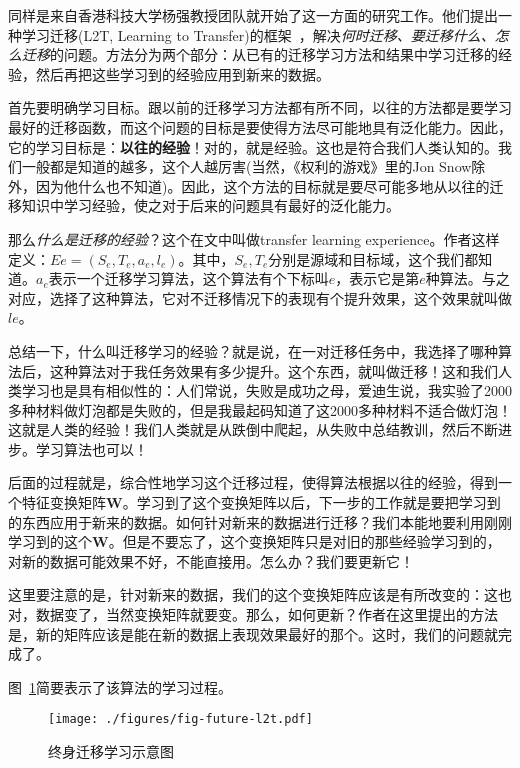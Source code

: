 同样是来自香港科技大学杨强教授团队就开始了这一方面的研究工作。他们提出一种学习迁移(L2T, Learning to Transfer)的框架~\cite{wei2017learning}，解决\textit{何时迁移、要迁移什么、怎么迁移}的问题。方法分为两个部分：从已有的迁移学习方法和结果中学习迁移的经验，然后再把这些学习到的经验应用到新来的数据。

首先要明确学习目标。跟以前的迁移学习方法都有所不同，以往的方法都是要学习最好的迁移函数，而这个问题的目标是要使得方法尽可能地具有泛化能力。因此，它的学习目标是：\textbf{以往的经验}！对的，就是经验。这也是符合我们人类认知的。我们一般都是知道的越多，这个人越厉害(当然，《权利的游戏》里的Jon Snow除外，因为他什么也不知道)。因此，这个方法的目标就是要尽可能多地从以往的迁移知识中学习经验，使之对于后来的问题具有最好的泛化能力。 

那么\textit{什么是迁移的经验}？这个在文中叫做transfer learning experience。作者这样定义：$Ee=(S_e,T_e,a_e,l_e)$。其中，$S_e,T_e$分别是源域和目标域，这个我们都知道。$a_e$表示一个迁移学习算法，这个算法有个下标叫$e$，表示它是第$e$种算法。与之对应，选择了这种算法，它对不迁移情况下的表现有个提升效果，这个效果就叫做$le$。

总结一下，什么叫迁移学习的经验？就是说，在一对迁移任务中，我选择了哪种算法后，这种算法对于我任务效果有多少提升。这个东西，就叫做迁移！这和我们人类学习也是具有相似性的：人们常说，失败是成功之母，爱迪生说，我实验了2000多种材料做灯泡都是失败的，但是我最起码知道了这2000多种材料不适合做灯泡！这就是人类的经验！我们人类就是从跌倒中爬起，从失败中总结教训，然后不断进步。学习算法也可以！ 

后面的过程就是，综合性地学习这个迁移过程，使得算法根据以往的经验，得到一个特征变换矩阵$\mathbf{W}$。学习到了这个变换矩阵以后，下一步的工作就是要把学习到的东西应用于新来的数据。如何针对新来的数据进行迁移？我们本能地要利用刚刚学习到的这个$\mathbf{W}$。但是不要忘了，这个变换矩阵只是对旧的那些经验学习到的，对新的数据可能效果不好，不能直接用。怎么办？我们要更新它！

这里要注意的是，针对新来的数据，我们的这个变换矩阵应该是有所改变的：这也对，数据变了，当然变换矩阵就要变。那么，如何更新？作者在这里提出的方法是，新的矩阵应该是能在新的数据上表现效果最好的那个。这时，我们的问题就完成了。 

图~\ref{fig-future-l2t}简要表示了该算法的学习过程。

\begin{figure}[htbp]
	\centering
	\texttt{[image: ./figures/fig-future-l2t.pdf]}
	\caption{终身迁移学习示意图}
	\label{fig-future-l2t}
\end{figure}


